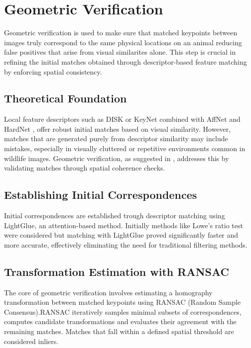 \chapter{Geometric Verification}
\label{chap:geometric_verification}
Geometric verification is used to make sure that matched keypoints between images truly correspond to the same physical locations on an animal reducing false positives that arise from visual similarites alone. This step is crucial in refining the initial matches obtained through descriptor-based feature matching by enforcing spatial consistency.

\section{Theoretical Foundation}
Local feature descriptors such as DISK\cite{tyszkiewicz2020disklearninglocalfeatures} or KeyNet combined with AffNet and HardNet \cite{keynet, mishkin2018repeatabilityenoughlearningaffine, Mishchuk2017HardNet}, offer robust initial matches based on visual similarity. However, matches that are generated purely from descriptor similarity may include mistakes, especially in visually cluttered or repetitive environments common in wildlife images. Geometric verification, as suggested in \cite{springerSpeciesAgnosticPatterned}, addresses this by validating matches through spatial coherence checks. 

\section{Establishing Initial Correspondences}
Initial correspondences are established trough descriptor matching using LightGlue\cite{lindenberger2023lightgluelocalfeaturematching}, an attention-based method. Initially methods like Lowe's ratio test were considered but matching with LightGlue proved significantly faster and more accurate, effectively eliminating the need for traditional filtering methods.

\section{Transformation Estimation with RANSAC}
The core of geometric verification involves estimating a homography transformation between matched keypoints using RANSAC (Random Sample Consensus).RANSAC iteratively samples minimal subsets of correspondences, computes candidate transformations and evaluates their agreement with the remaining matches. Matches that fall within a defined spatial threshold are considered inliers. 

